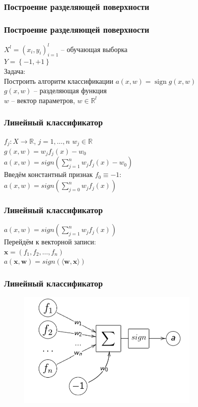 \documentclass[12pt]{beamer}
\DeclareMathOperator{\sign}{sign}
\begin{document}
\begin{frame}\frametitle{Построение разделяющей поверхности}
\end{frame}


\begin{frame}\frametitle{Построение разделяющей поверхности}
${X^l = (x_i,y_i)_{i = 1}^l}$ -- обучающая выборка\\ 
${Y=\left\{-1,+1\right\}}$\\
\vspace{5mm}
Задача:\\
Построить алгоритм классификации ${a(x,w) = \sign g(x,w)}$\\\vspace{5mm}
${g(x,w)}$ -- разделяющая функция\\
$w$ -- вектор параметров, $w \in \mathbb{R}^l$
\end{frame}


\begin{frame}\frametitle{Линейный классификатор}
$f_j: X \rightarrow \mathbb{R}$, $j = 1,\dots, n$ \hspace{5mm} $w_j \in \mathbb{R}$\\
$g(x, w) = w_jf_j(x) - w_0$\\
\vspace{5mm}
$a(x, w) = sign(\sum\limits_{j=1}^n w_jf_j(x) - w_0)$\\

\vspace{7mm}
Введём константный признак $f_0 \equiv -1$:\\
$a(x, w) = sign(\sum\limits_{j=0}^n w_jf_j(x))$\\
\end{frame}

\begin{frame}\frametitle{Линейный классификатор}
$a(x, w) = sign(\sum\limits_{j=1}^n w_jf_j(x))$\\

\vspace{3mm}
Перейдём к векторной записи:\\
$\mathbf{x} = (f_1, f_2, \dots, f_n)$\\
\vspace{3mm}
$a(\mathbf{x}, \mathbf{w}) = sign(\langle \mathbf{w}, \mathbf{x}\rangle)$\\
\end{frame}


\begin{frame}\frametitle{Линейный классификатор}
\begin{figure}[htbp]
  \includegraphics[height=160pt, keepaspectratio = true]{images/neuron}   
\end{figure}
\end{frame}
\end{document}

